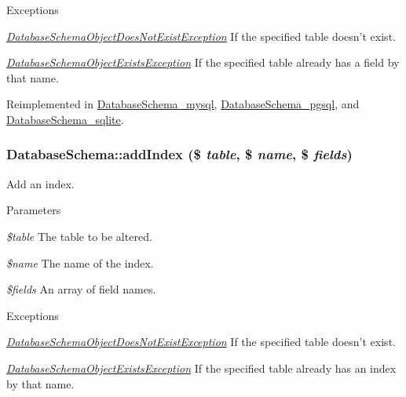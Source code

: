 \begin{DoxyExceptions}{Exceptions}
\item[{\em \hyperlink{classDatabaseSchemaObjectDoesNotExistException}{DatabaseSchemaObjectDoesNotExistException}}]If the specified table doesn't exist. \item[{\em \hyperlink{classDatabaseSchemaObjectExistsException}{DatabaseSchemaObjectExistsException}}]If the specified table already has a field by that name. \end{DoxyExceptions}


Reimplemented in \hyperlink{classDatabaseSchema__mysql_ae30b5689e92ccfc88f2dc2b7964d0234}{DatabaseSchema\_\-mysql}, \hyperlink{classDatabaseSchema__pgsql_ad2dad402ce094b71c40136b02c70bc3f}{DatabaseSchema\_\-pgsql}, and \hyperlink{classDatabaseSchema__sqlite_ae55ed07d32dcc323c699b490e0dc137b}{DatabaseSchema\_\-sqlite}.\hypertarget{classDatabaseSchema_a12f4b519abe55aaef3e4d736dbb27ab7}{
\subsubsection[{addIndex}]{\setlength{\rightskip}{0pt plus 5cm}DatabaseSchema::addIndex (\$ {\em table}, \/  \$ {\em name}, \/  \$ {\em fields})}}
\label{classDatabaseSchema_a12f4b519abe55aaef3e4d736dbb27ab7}
Add an index.


\begin{DoxyParams}{Parameters}
\item[{\em \$table}]The table to be altered. \item[{\em \$name}]The name of the index. \item[{\em \$fields}]An array of field names.\end{DoxyParams}

\begin{DoxyExceptions}{Exceptions}
\item[{\em \hyperlink{classDatabaseSchemaObjectDoesNotExistException}{DatabaseSchemaObjectDoesNotExistException}}]If the specified table doesn't exist. \item[{\em \hyperlink{classDatabaseSchemaObjectExistsException}{DatabaseSchemaObjectExistsException}}]If the specified table already has an index by that name. \end{DoxyExceptions}


